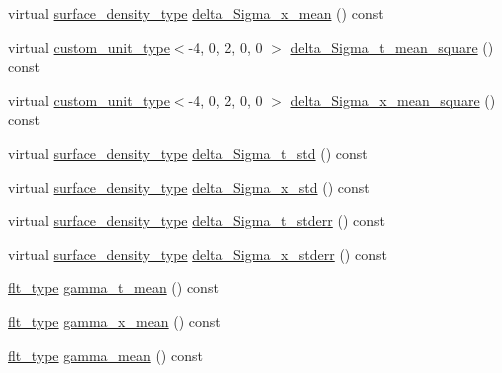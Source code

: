\begin{DoxyCompactItemize}
virtual \hyperlink{namespaceIceBRG_a80c597ef5ba0a32491d32a9f0083b02d}{surface\+\_\+density\+\_\+type} \hyperlink{classIceBRG_1_1pair__bin__summary_a8e885aafb07552b829d1d75db54d93b4}{delta\+\_\+\+Sigma\+\_\+x\+\_\+mean} () const 
\item 
virtual \hyperlink{namespaceIceBRG_a896bc1bf7e8db5ca045b9cf35912ca5e}{custom\+\_\+unit\+\_\+type}$<$-\/4, 0, 2, 0, 0 $>$ \hyperlink{classIceBRG_1_1pair__bin__summary_a752e84b6a079f91bbc64bfc746ec5b5d}{delta\+\_\+\+Sigma\+\_\+t\+\_\+mean\+\_\+square} () const 
\item 
virtual \hyperlink{namespaceIceBRG_a896bc1bf7e8db5ca045b9cf35912ca5e}{custom\+\_\+unit\+\_\+type}$<$-\/4, 0, 2, 0, 0 $>$ \hyperlink{classIceBRG_1_1pair__bin__summary_aa16505e993ab66451519a9ed4304c9a8}{delta\+\_\+\+Sigma\+\_\+x\+\_\+mean\+\_\+square} () const 
\item 
virtual \hyperlink{namespaceIceBRG_a80c597ef5ba0a32491d32a9f0083b02d}{surface\+\_\+density\+\_\+type} \hyperlink{classIceBRG_1_1pair__bin__summary_acd510011670a535d609e4ecb2fa8257f}{delta\+\_\+\+Sigma\+\_\+t\+\_\+std} () const 
\item 
virtual \hyperlink{namespaceIceBRG_a80c597ef5ba0a32491d32a9f0083b02d}{surface\+\_\+density\+\_\+type} \hyperlink{classIceBRG_1_1pair__bin__summary_a1779c3cbeaa111f27727d70481fb7ff9}{delta\+\_\+\+Sigma\+\_\+x\+\_\+std} () const 
\item 
virtual \hyperlink{namespaceIceBRG_a80c597ef5ba0a32491d32a9f0083b02d}{surface\+\_\+density\+\_\+type} \hyperlink{classIceBRG_1_1pair__bin__summary_a61f9c6863d1a2440e8d8c7d794b3c8c5}{delta\+\_\+\+Sigma\+\_\+t\+\_\+stderr} () const 
\item 
virtual \hyperlink{namespaceIceBRG_a80c597ef5ba0a32491d32a9f0083b02d}{surface\+\_\+density\+\_\+type} \hyperlink{classIceBRG_1_1pair__bin__summary_a1063e8e122208a24b240fb1e669d786c}{delta\+\_\+\+Sigma\+\_\+x\+\_\+stderr} () const 
\item 
\hyperlink{lib_2IceBRG__main_2common_8h_ad0f130a56eeb944d9ef2692ee881ecc4}{flt\+\_\+type} \hyperlink{classIceBRG_1_1pair__bin__summary_a15002ebbfb7d5309d5dfb012bd7ceb81}{gamma\+\_\+t\+\_\+mean} () const 
\item 
\hyperlink{lib_2IceBRG__main_2common_8h_ad0f130a56eeb944d9ef2692ee881ecc4}{flt\+\_\+type} \hyperlink{classIceBRG_1_1pair__bin__summary_a01072e7fd074b2521332e3ccf466c1ae}{gamma\+\_\+x\+\_\+mean} () const 
\item 
\hyperlink{lib_2IceBRG__main_2common_8h_ad0f130a56eeb944d9ef2692ee881ecc4}{flt\+\_\+type} \hyperlink{classIceBRG_1_1pair__bin__summary_a845031aad82a6757c43a2199a059ce63}{gamma\+\_\+mean} () const 

\end{DoxyCompactItemize}
